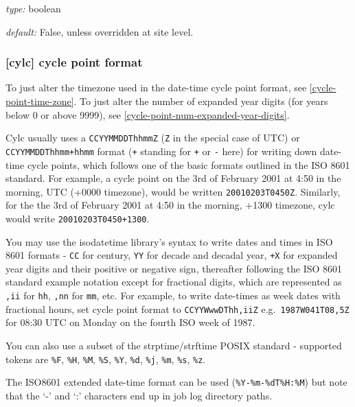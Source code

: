 \begin{myitemize}
    \item {\em type:} boolean
    \item {\em default:} False, unless overridden at site level.
\end{myitemize}

\subsubsection[cycle point format]{ [cylc] \textrightarrow cycle point format}
\label{cycle-point-format}

To just alter the timezone used in the date-time cycle point format, see
\ref{cycle-point-time-zone}. To just alter the number of expanded year digits
(for years below 0 or above 9999), see
\ref{cycle-point-num-expanded-year-digits}.

Cylc usually uses a \lstinline=CCYYMMDDThhmmZ= (\lstinline=Z= in the special
case of UTC) or \lstinline=CCYYMMDDThhmm+hhmm= format (\lstinline=+= standing
for \lstinline=+= or \lstinline=-= here) for writing down date-time cycle
points, which follows one of the basic formats outlined in the ISO 8601
standard. For example, a cycle point on the 3rd of February 2001 at 4:50 in
the morning, UTC (+0000 timezone), would be written
\lstinline=20010203T0450Z=. Similarly, for the the 3rd of February 2001 at
4:50 in the morning, +1300 timezone, cylc would write
\lstinline=20010203T0450+1300=.

You may use the isodatetime library's syntax to write dates and times in ISO
8601 formats - \lstinline=CC= for century, \lstinline=YY= for decade and
decadal year, \lstinline=+X= for expanded year digits and their positive or
negative sign, thereafter following the ISO 8601 standard example notation
except for fractional digits, which are represented as \lstinline=,ii= for
\lstinline=hh=, \lstinline=,nn= for \lstinline=mm=, etc. For example, to write
date-times as week dates with fractional hours, set cycle point format to
\lstinline=CCYYWwwDThh,iiZ= e.g.\  \lstinline=1987W041T08,5Z= for 08:30 UTC on
Monday on the fourth ISO week of 1987.

You can also use a subset of the strptime/strftime POSIX standard - supported
tokens are \lstinline=%F=, \lstinline=%H=, \lstinline=%M=, \lstinline=%S=,
\lstinline=%Y=, \lstinline=%d=, \lstinline=%j=, \lstinline=%m=,
\lstinline=%s=, \lstinline=%z=.

The ISO8601 extended date-time format can be used
(\lstinline=%Y-%m-%dT%H:%M=) but
note that the `-' and `:' characters end up in job log directory paths.

